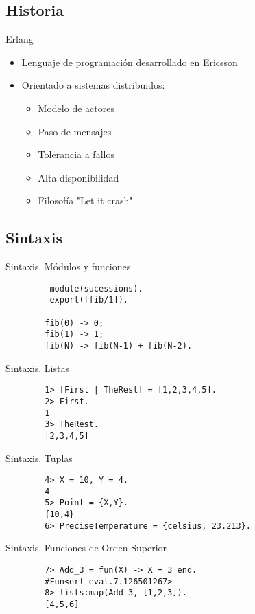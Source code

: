 \documentclass{beamer}
\begin{document}
    \subsection{Historia}
    \begin{frame}{Erlang}
      \begin{itemize}
        \item Lenguaje de programación desarrollado en Ericsson
        \item Orientado a sistemas distribuidos:
        \begin{itemize}
          \item Modelo de actores
          \item Paso de mensajes
          \item Tolerancia a fallos
          \item Alta disponibilidad
          \item Filosofía "Let it crash"
        \end{itemize}
      \end{itemize}
    \end{frame}
    \subsection{Sintaxis}
    \begin{frame}[fragile]{Sintaxis. Módulos y funciones}
      \begin{verbatim}
        -module(sucessions).
        -export([fib/1]).

        fib(0) -> 0;
        fib(1) -> 1;
        fib(N) -> fib(N-1) + fib(N-2).
      \end{verbatim}
    \end{frame}

    \begin{frame}[fragile]{Sintaxis. Listas}
      \begin{verbatim}
        1> [First | TheRest] = [1,2,3,4,5].
        2> First.
        1
        3> TheRest.
        [2,3,4,5]
      \end{verbatim}
    \end{frame}
    \begin{frame}[fragile]{Sintaxis. Tuplas}
      \begin{verbatim}
        4> X = 10, Y = 4.
        4
        5> Point = {X,Y}.
        {10,4}
        6> PreciseTemperature = {celsius, 23.213}.
      \end{verbatim}
    \end{frame}
    \begin{frame}[fragile]{Sintaxis. Funciones de Orden Superior}
      \begin{verbatim}
        7> Add_3 = fun(X) -> X + 3 end.
        #Fun<erl_eval.7.126501267>
        8> lists:map(Add_3, [1,2,3]).
        [4,5,6]
      \end{verbatim}
    \end{frame}
\end{document}

